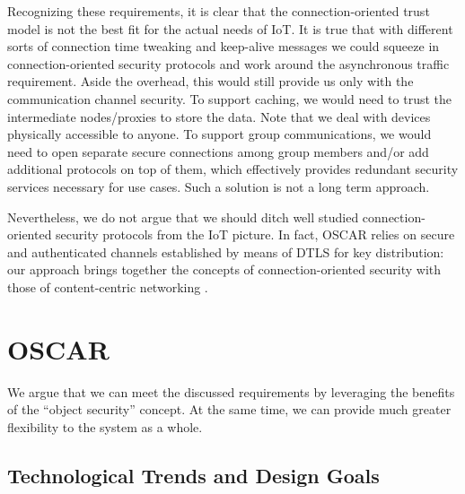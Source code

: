 \documentclass[conference]{IEEEtran}
\begin{document}
Recognizing these requirements, it is clear that the connection-oriented trust
model is not the best fit for the actual needs of IoT. It is
true that with different sorts of connection time tweaking and keep-alive
messages we could squeeze in connection-oriented security protocols and work
around the asynchronous traffic requirement. Aside the overhead, this would
still provide us only with the communication channel security. To support
caching, we would need to trust the intermediate nodes/proxies to store the
data. Note that we deal with devices physically accessible to anyone. To support
group communications, we would need to open separate secure connections among
group members and/or add additional protocols on top of them, which effectively
provides redundant security services necessary for use cases. Such a solution is
not a long term approach.
 
Nevertheless, we do not argue that we should ditch well studied
connection-oriented security protocols from the IoT picture. In fact, OSCAR
relies on secure and authenticated channels established by means of DTLS for key
distribution: our approach brings together the concepts of
connection-oriented security with those of content-centric networking
\cite{ccn}.
 


 
 
 















\section{OSCAR} \label{oscar}
We argue that we can meet the discussed requirements by leveraging the benefits of the ``object security'' concept. At the same time, we can provide much greater flexibility to the system as a whole. 







\subsection{Technological Trends and Design Goals}
\end{document}
